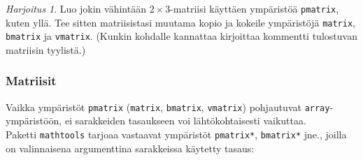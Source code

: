 \documentclass[handout,hyperref={colorlinks=true}]{beamer}
\theoremstyle{remark}
\newtheorem{harj}{Harjoitus}[section]
\newcommand{\vaihto}{\\ \vspace{10pt}}
\begin{document}
\begin{frame}[fragile]
    \begin{harj}
        Luo jokin vähintään \(2\times 3\)-matriisi käyttäen ympäristöä \verb-pmatrix-, kuten yllä. Tee sitten matriisistasi muutama kopio ja kokeile ympäristöjä \verb-matrix-, \verb-bmatrix- ja \verb-vmatrix-. (Kunkin kohdalle kannattaa kirjoittaa kommentti tulostuvan matriisin tyylistä.)
    \end{harj}
\end{frame}
\begin{frame}[fragile]
    \frametitle{Matriisit}
    Vaikka ympäristöt \verb-pmatrix- (\verb-matrix-, \verb-bmatrix-, \verb-vmatrix-) pohjautuvat \verb-array--ympäristöön, ei sarakkeiden tasaukseen voi lähtökohtaisesti vaikuttaa. \vaihto Paketti \verb-mathtools- tarjoaa vastaavat ympäristöt \verb-pmatrix*-, \verb-bmatrix*- jne., joilla on valinnaisena argumenttina sarakkeissa käytetty tasaus:\vaihto


\end{frame}
\end{document}
